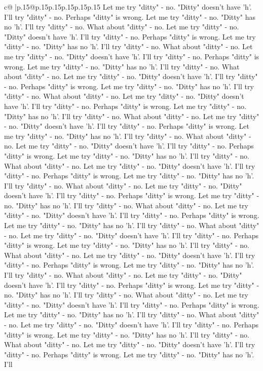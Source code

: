 \documentclass{article}
\begin{document}
{\begin{supertabular}{c@{$\;$}|p{.15\linewidth}@{}p{.15\linewidth}p{.15\linewidth}p{.15\linewidth}p{.15\linewidth}p{.15\linewidth}}
{{{Let me try "ditty" {-} no. "Ditty" doesn't have 'h'. I'll try "ditty" {-} no. Perhaps "ditty" is wrong. Let me try "ditty" {-} no. "Ditty" has no 'h'. I'll try "ditty" {-} no. What about "ditty" {-} no. Let me try "ditty" {-} no. "Ditty" doesn't have 'h'. I'll try "ditty" {-} no. Perhaps "ditty" is wrong. Let me try "ditty" {-} no. "Ditty" has no 'h'. I'll try "ditty" {-} no. What about "ditty" {-} no. Let me try "ditty" {-} no. "Ditty" doesn't have 'h'. I'll try "ditty" {-} no. Perhaps "ditty" is wrong. Let me try "ditty" {-} no. "Ditty" has no 'h'. I'll try "ditty" {-} no. What about "ditty" {-} no. Let me try "ditty" {-} no. "Ditty" doesn't have 'h'. I'll try "ditty" {-} no. Perhaps "ditty" is wrong. Let me try "ditty" {-} no. "Ditty" has no 'h'. I'll try "ditty" {-} no. What about "ditty" {-} no. Let me try "ditty" {-} no. "Ditty" doesn't have 'h'. I'll try "ditty" {-} no. Perhaps "ditty" is wrong. Let me try "ditty" {-} no. "Ditty" has no 'h'. I'll try "ditty" {-} no. What about "ditty" {-} no. Let me try "ditty" {-} no. "Ditty" doesn't have 'h'. I'll try "ditty" {-} no. Perhaps "ditty" is wrong. Let me try "ditty" {-} no. "Ditty" has no 'h'. I'll try "ditty" {-} no. What about "ditty" {-} no. Let me try "ditty" {-} no. "Ditty" doesn't have 'h'. I'll try "ditty" {-} no. Perhaps "ditty" is wrong. Let me try "ditty" {-} no. "Ditty" has no 'h'. I'll try "ditty" {-} no. What about "ditty" {-} no. Let me try "ditty" {-} no. "Ditty" doesn't have 'h'. I'll try "ditty" {-} no. Perhaps "ditty" is wrong. Let me try "ditty" {-} no. "Ditty" has no 'h'. I'll try "ditty" {-} no. What about "ditty" {-} no. Let me try "ditty" {-} no. "Ditty" doesn't have 'h'. I'll try "ditty" {-} no. Perhaps "ditty" is wrong. Let me try "ditty" {-} no. "Ditty" has no 'h'. I'll try "ditty" {-} no. What about "ditty" {-} no. Let me try "ditty" {-} no. "Ditty" doesn't have 'h'. I'll try "ditty" {-} no. Perhaps "ditty" is wrong. Let me try "ditty" {-} no. "Ditty" has no 'h'. I'll try "ditty" {-} no. What about "ditty" {-} no. Let me try "ditty" {-} no. "Ditty" doesn't have 'h'. I'll try "ditty" {-} no. Perhaps "ditty" is wrong. Let me try "ditty" {-} no. "Ditty" has no 'h'. I'll try "ditty" {-} no. What about "ditty" {-} no. Let me try "ditty" {-} no. "Ditty" doesn't have 'h'. I'll try "ditty" {-} no. Perhaps "ditty" is wrong. Let me try "ditty" {-} no. "Ditty" has no 'h'. I'll try "ditty" {-} no. What about "ditty" {-} no. Let me try "ditty" {-} no. "Ditty" doesn't have 'h'. I'll try "ditty" {-} no. Perhaps "ditty" is wrong. Let me try "ditty" {-} no. "Ditty" has no 'h'. I'll try "ditty" {-} no. What about "ditty" {-} no. Let me try "ditty" {-} no. "Ditty" doesn't have 'h'. I'll try "ditty" {-} no. Perhaps "ditty" is wrong. Let me try "ditty" {-} no. "Ditty" has no 'h'. I'll try "ditty" {-} no. What about "ditty" {-} no. Let me try "ditty" {-} no. "Ditty" doesn't have 'h'. I'll try "ditty" {-} no. Perhaps "ditty" is wrong. Let me try "ditty" {-} no. "Ditty" has no 'h'. I'll try "ditty" {-} no. What about "ditty" {-} no. Let me try "ditty" {-} no. "Ditty" doesn't have 'h'. I'll try "ditty" {-} no. Perhaps "ditty" is wrong. Let me try "ditty" {-} no. "Ditty" has no 'h'. I'll }}}
\end{supertabular}}
\end{document}
